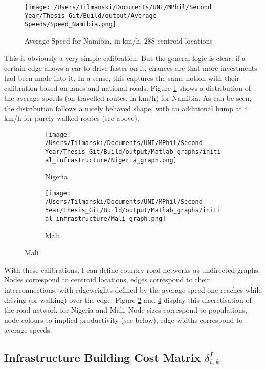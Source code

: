 \documentclass[11pt, oneside]{article}   	%
\begin{document}
\begin{figure}[!b]
  \centering
  \texttt{[image: /Users/Tilmanski/Documents/UNI/MPhil/Second Year/Thesis\_Git/Build/output/Average Speeds/Speed\_Namibia.png]}
  \caption{Average Speed for Namibia, in km/h, 288 centroid locations}
  \label{fig:speed_namibia}
\end{figure}

This is obviously a very simple calibration. But the general logic is clear: if a certain edge allows a car to drive faster on it, chances are that more investments had been made into it. In a sense, this captures the same notion \citeauthor{fajgelbaum_optimal_2017} with their calibration based on lanes and national roads. Figure \ref{fig:speed_namibia} shows a distribution of the average speeds (on travelled routes, in km/h) for Namibia. As can be seen, the distribution follows a nicely behaved shape, with an additional hump at 4 km/h for purely walked routes (see above).

\begin{figure}[h]
\centering
\caption{Discretised Networks for different countries}

\begin{subfigure}[c]{0.48\textwidth}
\texttt{[image: /Users/Tilmanski/Documents/UNI/MPhil/Second Year/Thesis\_Git/Build/output/Matlab\_graphs/initial\_infrastructure/Nigeria\_graph.png]}
\caption{Nigeria}
\label{fig:nigeria_mat}
\end{subfigure}
\begin{subfigure}[c]{0.48\textwidth}
\texttt{[image: /Users/Tilmanski/Documents/UNI/MPhil/Second Year/Thesis\_Git/Build/output/Matlab\_graphs/initial\_infrastructure/Mali\_graph.png]}
\caption{Mali}
\label{fig:Mali_mat}
\end{subfigure}

\end{figure}

With these calibrations, I can define country road networks as undirected graphs. Nodes correspond to centroid locations, edges correspond to their interconnections, with edgeweights defined by the average speed one reaches while driving (or walking) over the edge. Figure \ref{fig:nigeria_mat} and \ref{fig:Mali_mat} display this discretisation of the road network for Nigeria and Mali. Node sizes correspond to populations, node colours to implied productivity (see below), edge widths correspond to average speeds.

\subsection{Infrastructure Building Cost Matrix $\delta^{I}_{i,k}$}
\end{document}
